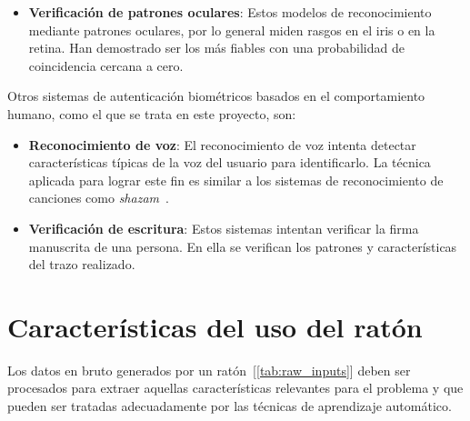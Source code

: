 \begin{enumerate}
\begin{itemize}
              \item \textbf{Verificación de patrones oculares}: Estos modelos de reconocimiento mediante patrones oculares, por lo general miden rasgos en el iris o en la retina. Han demostrado ser los más fiables con una probabilidad de coincidencia cercana a cero.

          \end{itemize}

          Otros sistemas de autenticación biométricos basados en el comportamiento humano, como el que se trata en este proyecto, son:

          \begin{itemize}
              \item \textbf{Reconocimiento de voz}: El reconocimiento de voz intenta detectar características típicas de la voz del usuario para identificarlo. La técnica aplicada para lograr este fin es similar a los sistemas de reconocimiento de canciones como \textit{shazam}~\cite{WangAvery}.


              \item \textbf{Verificación de escritura}: Estos sistemas intentan verificar la firma manuscrita de una persona. En ella se verifican los patrones y características del trazo realizado.



          \end{itemize}



\end{enumerate}



\section{Características del uso del ratón}

Los datos en bruto generados por un ratón~[\cref{tab:raw_inputs}] deben ser procesados para extraer aquellas características relevantes para el problema y que pueden ser tratadas adecuadamente por las técnicas de aprendizaje automático.

